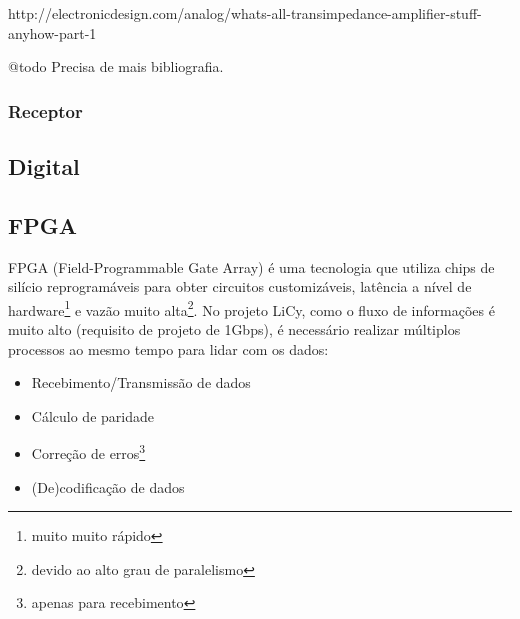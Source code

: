 	http://electronicdesign.com/analog/whats-all-transimpedance-amplifier-stuff-anyhow-part-1
	
	@todo	Precisa de mais bibliografia.
	
	\subsubsection{Receptor}
	
	\subsection{Digital}

	\subsection{FPGA}\label{hard-fpga}
	
	FPGA (Field-Programmable Gate Array) é uma tecnologia que utiliza chips de silício reprogramáveis para obter circuitos customizáveis, latência a nível de hardware\footnote{muito muito rápido} e vazão muito alta\footnote{devido ao alto grau de paralelismo}. No projeto LiCy, como o fluxo de informações é muito alto (requisito de projeto de 1Gbps), é necessário realizar múltiplos processos ao mesmo tempo para lidar com os dados:
	
	\begin{itemize}  
		\item Recebimento/Transmissão de dados
		\item Cálculo de paridade
		\item Correção de erros\footnote{apenas para recebimento}
		\item (De)codificação de dados
	\end{itemize}
	

